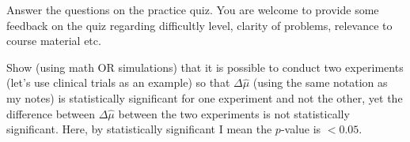 \begin{exercise}
Answer the questions on the practice quiz. You are welcome to provide some feedback on the quiz regarding difficultly level, clarity of problems, relevance to course material etc. 
\end{exercise}



\begin{exercise}
Show (using math OR simulations) that it is possible to conduct two experiments (let's use clinical trials as an example) so that $\Delta \hat{\mu}$ (using the same notation as my notes) is statistically significant for one experiment and not the other, yet the difference between $\Delta \hat{\mu}$ between the two experiments is not statistically significant.  Here, by statistically significant I mean the $p$-value is $<0.05$. 
\end{exercise}





 





